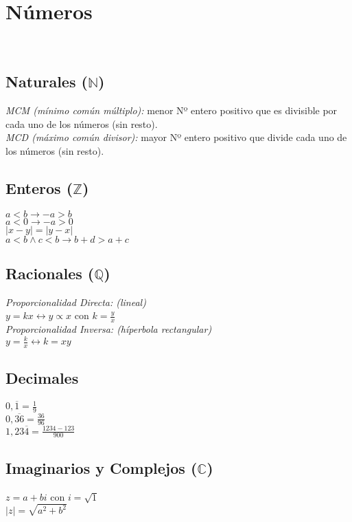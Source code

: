 \section{Números}
\def\svgwidth{\columnwidth}
\\
\subsection{Naturales ($\mathbb{N}$)}
\textit{MCM (mínimo común múltiplo):}
menor Nº  entero positivo que es divisible por cada uno de los números (sin resto).\\

\textit{MCD (máximo común divisor):}
mayor Nº entero positivo que divide cada uno de los números (sin resto).\\

\subsection{Enteros ($\mathbb{Z}$)}
$a < b \rightarrow -a > b$\\
$a < 0 \rightarrow -a > 0$\\
$|x - y| = |y - x|$\\
$ a < b \land c < b \rightarrow b + d > a + c $\\

\subsection{Racionales ($\mathbb{Q}$)}
\textit{Proporcionalidad Directa: (lineal)}\\
$ y = kx \leftrightarrow y \propto x $ con $k = \frac{y}{x}$\\

\textit{Proporcionalidad Inversa: (híperbola rectangular)}\\
$ y = \frac{k}{x} \leftrightarrow k = xy$\\

\subsection{Decimales}
$ 0,\overline{1} = \frac{1}{9} $\\
$ 0,\overline{36} = \frac{36}{96} $\\
$ 1,23\overline{4} = \frac{1234 -123}{900} $\\

\subsection{Imaginarios y Complejos ($\mathbb{C}$)}
$ z = a + bi $ con $ i = \sqrt{1} $\\
$\mid z \mid = \sqrt{a^2 + b^2}$\\

